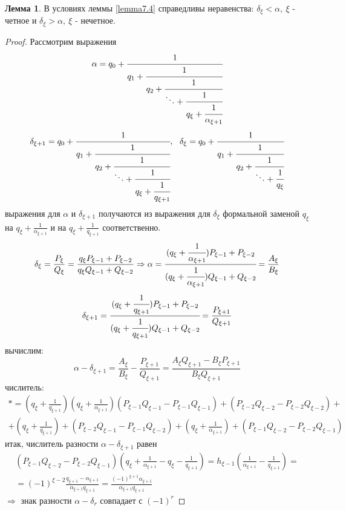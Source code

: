 \documentclass[a4paper, 12pt]{article}
\theoremstyle{definition}
\newtheorem{lemma}{Лемма}[section]
\begin{document}
    \begin{lemma} \label{lemma7.5}
        В условиях леммы \ref{lemma7.4} справедливы неравенства: $\delta_{\xi}<\alpha,\ \xi$ - четное и $\delta_{\xi}>\alpha,\ \xi$ - нечетное.
    \end{lemma} 
    \begin{proof}
        Рассмотрим выражения
        \[\alpha=q_0+\cfrac{1}{q_1+\cfrac{1}{q_2+\cfrac{1}{\ddots+\cfrac{1}{q_{\xi}+\cfrac{1}{\alpha_{\xi+1}}}}}}\]
        \[\delta_{\xi+1}=q_0+\cfrac{1}{q_1+\cfrac{1}{q_2+\cfrac{1}{\ddots+\cfrac{1}{q_{\xi}+\cfrac{1}{q_{\xi+1}}}}}},\ \ \delta_{\xi}=q_0+\cfrac{1}{q_1+\cfrac{1}{q_2+\cfrac{1}{\ddots+\cfrac{1}{q_{\xi}}}}}\]
        выражения для $\alpha$ и $\delta_{\xi+1}$ получаются из выражения для $\delta_{\xi}$ формальной заменой $q_{\xi}$ на $q_{\xi}+\frac{1}{\alpha_{\xi+1}}$ и на $q_{\xi}+\frac{1}{q_{\xi+1}}$ соответственно.
        \[\delta_{\xi}=\frac{P_{\xi}}{Q_{\xi}}=\frac{q_{\xi}P_{\xi-1}+P_{\xi-2}}{q_{\xi}Q_{\xi-1}+Q_{\xi-2}} \Rightarrow \alpha=\cfrac{(q_{\xi}+\cfrac{1}{\alpha_{\xi+1}})P_{\xi-1}+P_{\xi-2}}{(q_{\xi}+\cfrac{1}{\alpha_{\xi+1}})Q_{\xi-1}+Q_{\xi-2}}=\frac{A_{\xi}}{B_{\xi}}\]
        \[\delta_{\xi+1}=\cfrac{(q_{\xi}+\cfrac{1}{q_{\xi+1}})P_{\xi-1}+P_{\xi-2}}{(q_{\xi}+\cfrac{1}{q_{\xi+1}})Q_{\xi-1}+Q_{\xi-2}}=\frac{P_{\xi+1}}{Q_{\xi+1}}\]
        вычислим:
        \[\alpha-\delta_{\xi+1}=\frac{A_{\xi}}{B_{\xi}}-\frac{P_{\xi+1}}{Q_{\xi+1}}=\frac{A_{\xi}Q_{\xi+1}-B_{\xi}P_{\xi+1}}{B_{\xi}Q_{\xi+1}}\]
        числитель:
        \begin{multline*}
            \ast = (q_{\xi}+\frac{1}{q_{\xi+1}})(q_{\xi}+\frac{1}{\alpha_{\xi+1}})(P_{\xi-1}Q_{\xi-1}-P_{\xi-1}Q_{\xi-1})+(P_{\xi-2}Q_{\xi-2}-P_{\xi-2}Q_{\xi-2})+\\
            +(q_{\xi}+\frac{1}{q_{\xi+1}})+(P_{\xi-2}Q_{\xi-1}-P_{\xi-1}Q_{\xi-2})+(q_{\xi}+\frac{1}{\alpha_{\xi+1}})+(P_{\xi-1}Q_{\xi-2}-P_{\xi-2}Q_{\xi-1})
        \end{multline*}
        итак, числитель разности $\alpha-\delta_{\xi+1}$ равен
        \begin{multline*}
            (P_{\xi-1}Q_{\xi-2}-P_{\xi-2}Q_{\xi-1})(q_{\xi}+\frac{1}{\alpha_{\xi+1}}-q_{\xi}-\frac{1}{q_{\xi+1}})=h_{\xi-1}(\frac{1}{\alpha_{\xi+1}}-\frac{1}{q_{\xi+1}})=\\
            =(-1)^{\xi-2}\frac{q_{\xi+1}-\alpha_{\xi+1}}{\alpha_{\xi+1}q_{\xi+1}}=\frac{(-1)^{\xi+1}\alpha_{\xi+1}}{\alpha_{\xi+1}q_{\xi+1}}
        \end{multline*}
        $\Rightarrow$ знак разности $\alpha-\delta_r$ совпадает с $(-1)^r$
    \end{proof} 
\end{document}
